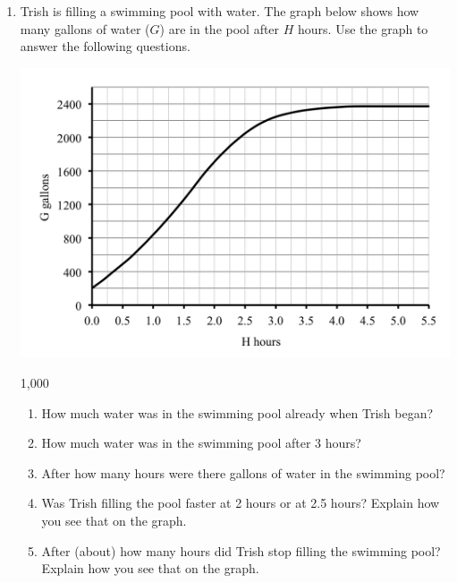 \documentclass[12pt]{article}
\begin{document}
\begin{enumerate}
\item Trish is filling a swimming pool with water.  The graph below shows how many gallons of water ($G$) are in the pool after $H$ hours.  Use the graph to answer the following questions.
\begin{center}
 {\includegraphics [width = 6in] {fillingtankNEW}}
\end{center} 1,000
\begin{enumerate}
\item How much water was in the swimming pool already when Trish began? \vfill
\item How much water was in the swimming pool after 3 hours? \vfill
\item After how many hours were there  gallons of water in the swimming pool? \vfill
\item Was Trish filling the pool faster at 2 hours or at 2.5 hours?  Explain how you see that on the graph. \vfill
\item After (about) how many hours did Trish stop filling the swimming pool?  Explain how you see that on the graph. \vfill
\end{enumerate}

\newpage


\end{enumerate}
\end{document}
